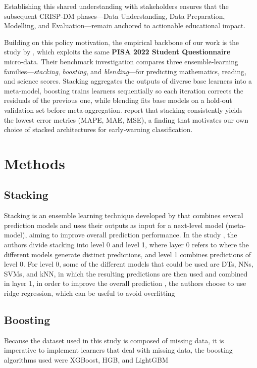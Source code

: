 \documentclass[final,5p,times,twocolumn,authoryear]{elsarticle}
\begin{document}
Establishing this shared understanding with stakeholders ensures that the subsequent CRISP‑DM phases—Data Understanding, Data Preparation, Modelling, and Evaluation—remain anchored to actionable educational impact.


Building on this policy motivation, the empirical backbone of our work is the study by \cite{Stacking}, which exploits the same \textbf{PISA 2022 Student Questionnaire} micro‑data.  Their benchmark investigation compares three ensemble‑learning families—\emph{stacking}, \emph{boosting}, and \emph{blending}—for predicting mathematics, reading, and science scores.  Stacking aggregates the outputs of diverse base learners into a meta‑model, boosting trains learners sequentially so each iteration corrects the residuals of the previous one, while blending fits base models on a hold‑out validation set before meta‑aggregation.  \citeauthor{Stacking} report that stacking consistently yields the lowest error metrics (MAPE, MAE, MSE), a finding that motivates our own choice of stacked architectures for early‑warning classification.






\section{Methods}

\subsection{Stacking}
Stacking is an ensemble learning technique developed by \cite{WOLPERT1992241} that combines several prediction models and uses their outputs as input for a next-level model (meta-model), aiming to improve overall prediction performance\cite{Stacking}. In the study \cite{Stacking}, the authors divide stacking into level 0 and level 1, where layer 0 refers to where the different models generate distinct predictions, and level 1 combines predictions of level 0. For level 0, some of the different models that could be used are DTs, NNs, SVMs, and kNN, in which the resulting predictions are then used and combined in layer 1, in order to improve the overall prediction \cite{WOLPERT1992241}, the authors choose to use ridge regression, which can be useful to avoid overfitting \cite{CUI2021107038}
\subsection{Boosting}
Because the dataset used in this study is composed of missing data, it is imperative to implement learners that deal with missing data, the boosting algorithms used were XGBoost, HGB, and LightGBM \cite{Stacking}
\end{document}
